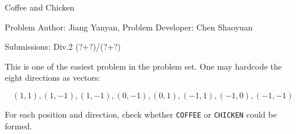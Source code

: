 \begin{Solution}{Coffee and Chicken}

\begin{frame}{\ProblemName}

\small Problem Author: Jiang Yanyan, Problem Developer: Chen Shaoyuan \par \vspace{0.3cm}

\small Submissions: Div.2 (?+?)/(?+?) \par \vspace{0.5cm}

This is one of the easiest problem in the problem set. One may hardcode the eight directions as vectors: 

$$(1, 1), (1, -1), (1, -1), (0, -1), (0, 1), (-1, 1), (-1, 0), (-1, -1)$$

For each position and direction, check whether \texttt{COFFEE} or \texttt{CHICKEN} could be formed.

\end{frame}

\end{Solution}
